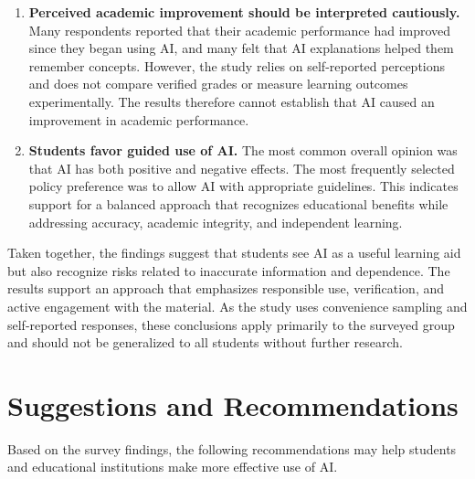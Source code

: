 \documentclass[12pt,a4paper]{article}
\begin{document}
\begin{enumerate}
    \item \textbf{Perceived academic improvement should be interpreted cautiously.}
    Many respondents reported that their academic performance had improved since they began using AI, and many felt that AI explanations helped them remember concepts. However, the study relies on self-reported perceptions and does not compare verified grades or measure learning outcomes experimentally. The results therefore cannot establish that AI caused an improvement in academic performance.

    \item \textbf{Students favor guided use of AI.}
    The most common overall opinion was that AI has both positive and negative effects. The most frequently selected policy preference was to allow AI with appropriate guidelines. This indicates support for a balanced approach that recognizes educational benefits while addressing accuracy, academic integrity, and independent learning.
\end{enumerate}

Taken together, the findings suggest that students see AI as a useful learning aid but also recognize risks related to inaccurate information and dependence. The results support an approach that emphasizes responsible use, verification, and active engagement with the material. As the study uses convenience sampling and self-reported responses, these conclusions apply primarily to the surveyed group and should not be generalized to all students without further research.

\section{Suggestions and Recommendations}
\label{sec:recommendations}

Based on the survey findings, the following recommendations may help students and educational institutions make more effective use of AI.
\end{document}
